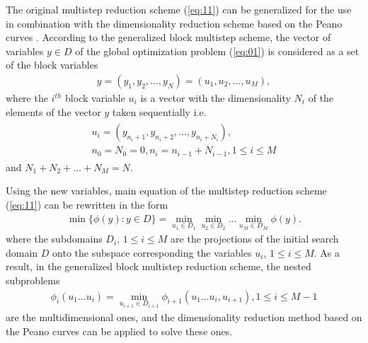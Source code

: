 \documentclass[runningheads]{llncs}
\begin{document}
The original multistep reduction scheme (\ref{eq:11}) can be generalized for the use in combination with the dimensionality reduction scheme based on the Peano curves \cite{c36}. According to the generalized block multistep scheme, the vector of variables $y \in D$ of the global optimization problem (\ref{eq:01}) is considered as a set of the block variables 
\begin{eqnarray} 
y = (y_1, y_2, \dots, y_N) = (u_1, u_2, \dots, u_M),
\end{eqnarray}
where the $i^{th}$ block variable $u_i$ is a vector with the dimensionality $N_i$ of the elements of the vector $y$ taken sequentially i.e. 
\begin{eqnarray}
\begin{aligned}
u_{i}=(y_{n_i+1},y_{n_i+2},\dots,y_{n_i+N_{i}}), \\
n_0=N_0=0, n_i=n_{i-1}+N_{i-1} ,1 \leq i \leq M
\end{aligned}
\end{eqnarray}
and $N_1 + N_2 + \dots + N_M = N$.

Using the new variables, main equation of the multistep reduction scheme (\ref{eq:11}) can be rewritten in the form
\begin{eqnarray} \label{eq:12}
\min{\{\phi(y): y \in D\}} = 
\min_{u_1 \in D_1}{ \min_{u_2 \in D_2}{ \dots \min_{u_M \in D_M}{ \phi(y) } } }.
\end{eqnarray}
where the subdomains $D_i$, $1 \leq i \leq M$ are the projections of the initial search domain $D$ onto the subspace corresponding the variables $u_i$, $1 \leq i \leq M$. As a result, in the generalized block multistep reduction scheme, the nested subproblems
\begin{eqnarray} \label{eq:13}
\phi_i(u_1 \dots u_i) = 
\min_{u_{i + 1} \in D_{i + 1}}{\phi_{i+1}(u_1 \dots u_i, u_{i+1})},1 \leq i \leq M-1
\end{eqnarray}
are the multidimensional ones, and  the dimensionality reduction method based on the Peano curves can be applied to solve these ones.
\end{document}
